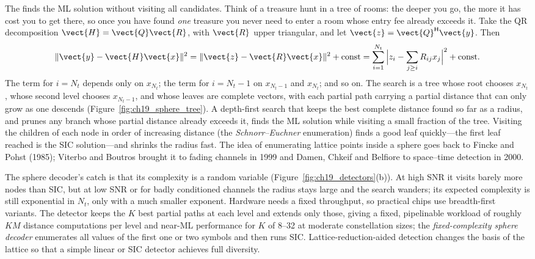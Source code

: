 The  finds the ML solution without visiting all candidates. Think of a
treasure hunt in a tree of rooms: the deeper you go, the more it has cost you to get there, so once
you have found \emph{one} treasure you never need to enter a room whose entry fee already exceeds
it. Take the QR decomposition $\vect{H}=\vect{Q}\vect{R}$, with $\vect{R}$ upper triangular, and let
$\vect{z}=\vect{Q}^{\mathsf H}\vect{y}$. Then
\begin{equation}
\|\vect{y}-\vect{H}\vect{x}\|^2=\|\vect{z}-\vect{R}\vect{x}\|^2+\text{const}
=\sum_{i=1}^{N_t}\Big|z_i-\sum_{j\ge i}R_{ij}x_j\Big|^2+\text{const}.
\end{equation}
The term for $i=N_t$ depends only on $x_{N_t}$; the term for $i=N_t-1$ on $x_{N_t-1}$ and
$x_{N_t}$; and so on. The search is a tree whose root chooses $x_{N_t}$, whose second level chooses
$x_{N_t-1}$, and whose leaves are complete vectors, with each partial path carrying a partial
distance that can only grow as one descends (Figure~\ref{fig:ch19_sphere_tree}). A depth-first search
that keeps the best complete distance found so far as a radius, and prunes any branch whose partial
distance already exceeds it, finds the ML solution while visiting a small fraction of the tree.
Visiting the children of each node in order of increasing distance (the \emph{Schnorr--Euchner}
enumeration) finds a good leaf quickly---the first leaf reached is the SIC solution---and shrinks
the radius fast. The idea of enumerating lattice points inside a sphere goes back to Fincke and
Pohst (1985); Viterbo and Boutros brought it to fading channels in 1999 and Damen, Chkeif and
Belfiore to space--time detection in 2000.


The sphere decoder's catch is that its complexity is a random variable
(Figure~\ref{fig:ch19_detectors}(b)). At high SNR it visits barely more nodes than SIC, but at low SNR
or for badly conditioned channels the radius stays large and the search wanders; its expected
complexity is still exponential in $N_t$, only with a much smaller exponent. Hardware needs a fixed
throughput, so practical chips use breadth-first variants. The  detector keeps the $K$
best partial paths at each level and extends only those, giving a fixed, pipelinable workload of
roughly $KM$ distance computations per level and near-ML performance for $K$ of 8--32 at
moderate constellation sizes; the \emph{fixed-complexity sphere decoder} enumerates all values of
the first one or two symbols and then runs SIC. Lattice-reduction-aided detection changes the basis
of the lattice so that a simple linear or SIC detector achieves full diversity.

